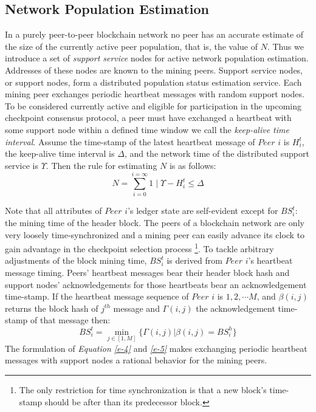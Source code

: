 \subsection{Network Population Estimation}
In a purely peer-to-peer blockchain network no peer has an accurate estimate of the size of the currently active peer population, that is, the value of $N$. Thus we introduce a set of \textit{support service} nodes for active network population estimation. Addresses of these nodes are known to the mining peers. Support service nodes, or support nodes, form a distributed population status estimation service. Each mining peer exchanges periodic heartbeat messages with random support nodes. To be considered currently active and eligible for participation in the upcoming checkpoint consensus protocol, a peer must have exchanged a heartbeat with some support node within a defined time window we call the \textit{keep-alive time interval}. Assume the time-stamp of the latest heartbeat message of $Peer$ $i$ is $H_i^t$, the keep-alive time interval is $\Delta$, and the network time of the distributed support service is $\Upsilon$. Then the rule for estimating $N$ is as follows:  
\begin{equation}
\label{e-4}
N = \sum_{i = 0}^{i = \infty}{1 \mid \Upsilon - H_i^t \leq \Delta}
\end{equation}

Note that all attributes of $Peer$ $i$'s ledger state are self-evident except for $BS_i^t$: the mining time of the header block. The peers of a blockchain network are only very loosely time-synchronized \cite{Turek:1992:MFC:136541.136542} and a mining peer can easily advance its clock to gain advantage in the checkpoint selection process \footnote{The only restriction for time synchronization is that a new block's time-stamp should be after than its predecessor block.}. To tackle arbitrary adjustments of the block mining time, $BS_i^t$ is derived from $Peer$ $i$'s heartbeat message timing. Peers' heartbeat messages bear their header block hash and support nodes' acknowledgements for those heartbeats bear an acknowledgement time-stamp. If the heartbeat message sequence of $Peer$ $i$ is $1, 2, \cdots M$, and $\beta(i,j)$ returns the block hash of $j^{th}$ message and $\Gamma(i, j)$ the acknowledgement time-stamp of that message then:
\begin{equation}
\label{e-5}
BS_i^t = \min_{j \in \left[ 1, M \right]}\{\Gamma(i, j) | \beta(i,j) = BS_i^h \}
\end{equation}
The formulation of \textit{Equation \ref{e-4}} and \textit{\ref{e-5}} makes exchanging periodic heartbeat messages with support nodes a rational behavior for the mining peers.

